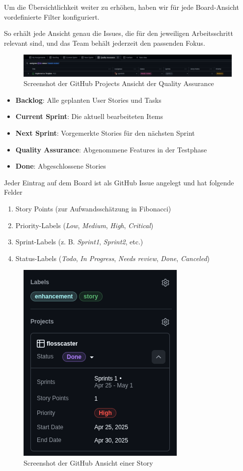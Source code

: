 \documentclass{article}
\begin{document}
Um die Übersichtlichkeit weiter zu erhöhen, haben wir für jede Board-Ansicht vordefinierte Filter konfiguriert.

So erhält jede Ansicht genau die Issues, die für den jeweiligen Arbeitsschritt relevant sind, und das Team behält jederzeit den passenden Fokus.

\begin{figure}[h]
  \caption{Screenshot der GitHub Projects Ansicht der Quality Assurance}
  \centering
  \includegraphics[width=\textwidth]{quality_assurance.png}
\end{figure}

\begin{itemize}
  \item \textbf{Backlog}: Alle geplanten User Stories und Tasks
  \item \textbf{Current Sprint}: Die aktuell bearbeiteten Items
  \item \textbf{Next Sprint}: Vorgemerkte Stories für den nächsten Sprint
  \item \textbf{Quality Assurance}: Abgenommene Features in der Testphase
  \item \textbf{Done}: Abgeschlossene Stories
\end{itemize}

Jeder Eintrag auf dem Board ist als GitHub Issue angelegt und hat folgende Felder

\begin{enumerate}
  \item Story Points (zur Aufwandsschätzung in Fibonacci)
  \item Priority-Labels (\textit{Low}, \textit{Medium}, \textit{High}, \textit{Critical})
  \item Sprint-Labels (z. B. \textit{Sprint1}, \textit{Sprint2}, etc.)
  \item Status-Labels (\textit{Todo}, \textit{In Progress}, \textit{Needs review}, \textit{Done}, \textit{Canceled})
\end{enumerate}

\begin{figure}[h]
  \caption{Screenshot der GitHub Ansicht einer Story}
  \centering
  \includegraphics[width=.3\textwidth]{overview.png}
\end{figure}
\end{document}
